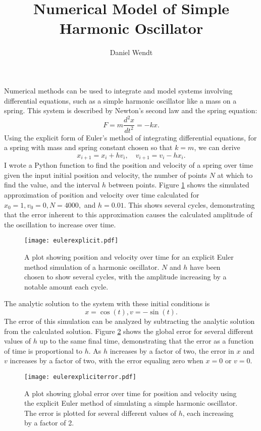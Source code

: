 \documentclass{article}
\title{Numerical Model of Simple Harmonic Oscillator}
\author{Daniel Wendt}
\begin{document}
\maketitle

Numerical methods can be used to integrate and model systems involving differential equations, such as a simple harmonic oscillator like a mass on a spring. This system is described by Newton's second law and the spring equation: $$F=m\frac{d^2x}{dt^2}=-kx.$$ Using the explicit form of Euler's method of integrating differential equations, for a spring with mass and spring constant chosen so that $k=m$, we can derive $$x_{i+1}=x_i+hv_i,\quad v_{i+1}=v_i-hx_i.$$ I wrote a Python function to find the position and velocity of a spring over time given the input initial position and velocity, the number of points $N$ at which to find the value, and the interval $h$ between points. Figure \ref{eulerexplicit} shows the simulated approximation of position and velocity over time calculated for $x_0=1,v_0=0,N=4000,$ and $h=0.01$. This shows several cycles, demonstrating that the error inherent to this approximation causes the calculated amplitude of the oscillation to increase over time. 

\begin{figure}[H]
	\centering
	\texttt{[image: eulerexplicit.pdf]}
	\caption{A plot showing position and velocity over time for an explicit Euler method simulation of a harmonic oscillator. $N$ and $h$ have been chosen to show several cycles, with the amplitude increasing by a notable amount each cycle.}
	\label{eulerexplicit}
\end{figure}

The analytic solution to the system with these initial conditions is $$x=\cos(t),v=-\sin(t).$$ The error of this simulation can be analyzed by subtracting the analytic solution from the calculated solution. Figure \ref{expliciterror} shows the global error for several different values of $h$ up to the same final time, demonstrating that the error as a function of time is proportional to $h$. As $h$ increases by a factor of two, the error in $x$ and $v$ increases by a factor of two, with the error equaling zero when $x=0$ or $v=0$.

\begin{figure}[H]
	\centering
	\texttt{[image: eulerexpliciterror.pdf]}
	\caption{A plot showing global error over time for position and velocity using the explicit Euler method of simulating a simple harmonic oscillator. The error is plotted for several different values of $h$, each increasing by a factor of 2.}
	\label{expliciterror}
\end{figure}
\end{document}
